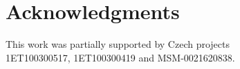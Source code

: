 \documentclass{sig-alternate}
\begin{document}
\section{Acknowledgments}
This work was partially supported by Czech projects \\1ET100300517, 1ET100300419 and MSM-0021620838.
%

%
%
\balancecolumns %
\end{document}
